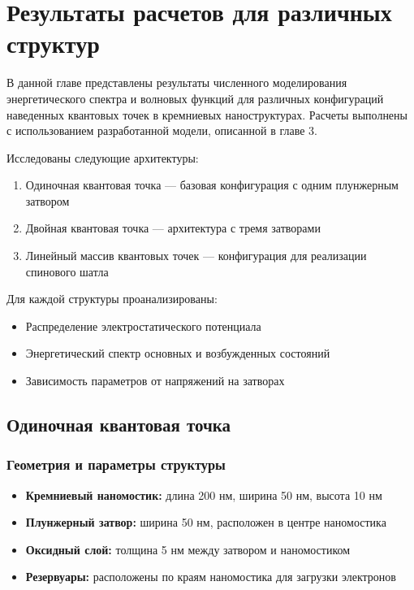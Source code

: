 \documentclass[a4paper,14pt]{extreport} %
\begin{document}
\chapter{Результаты расчетов для различных структур}

В данной главе представлены результаты численного моделирования энергетического спектра 
и волновых функций для различных конфигураций наведенных квантовых точек в кремниевых 
наноструктурах. Расчеты выполнены с использованием разработанной модели, описанной в главе 3.

Исследованы следующие архитектуры:
\begin{enumerate}
    \item Одиночная квантовая точка — базовая конфигурация с одним плунжерным затвором
    \item Двойная квантовая точка — архитектура с тремя затворами
    \item Линейный массив квантовых точек — конфигурация для реализации спинового шатла
\end{enumerate}

Для каждой структуры проанализированы:
\begin{itemize}
    \item Распределение электростатического потенциала
    \item Энергетический спектр основных и возбужденных состояний
    \item Зависимость параметров от напряжений на затворах
\end{itemize}

\section{Одиночная квантовая точка}

\subsection{Геометрия и параметры структуры}

\begin{itemize}
    \item \textbf{Кремниевый наномостик:} длина 200 нм, ширина 50 нм, высота 10 нм
    \item \textbf{Плунжерный затвор:} ширина 50 нм, расположен в центре наномостика
    \item \textbf{Оксидный слой:} толщина 5 нм между затвором и наномостиком
    \item \textbf{Резервуары:} расположены по краям наномостика для загрузки электронов
\end{itemize}
\end{document}
